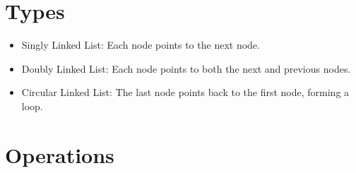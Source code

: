 \documentclass[
  letterpaper,
  DIV=11,
  numbers=noendperiod]{scrreprt}
\providecommand{\tightlist}{%
  \setlength{\itemsep}{0pt}\setlength{\parskip}{0pt}}
\begin{document}
\section{Types}

\begin{itemize}
\tightlist
\item
  Singly Linked List: Each node points to the next node.
\item
  Doubly Linked List: Each node points to both the next and previous
  nodes.
\item
  Circular Linked List: The last node points back to the first node,
  forming a loop.
\end{itemize}

\section{Operations}
\end{document}
